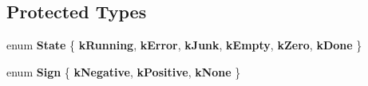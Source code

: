\subsection*{Protected Types}
\begin{DoxyCompactItemize}
\item 
\mbox{\label{classv8_1_1internal_1_1StringToIntHelper_a40ccc996ea74f912ccc03a26e29133b0}} 
enum {\bfseries State} \{ \newline
{\bfseries k\+Running}, 
{\bfseries k\+Error}, 
{\bfseries k\+Junk}, 
{\bfseries k\+Empty}, 
\newline
{\bfseries k\+Zero}, 
{\bfseries k\+Done}
 \}
\item 
\mbox{\label{classv8_1_1internal_1_1StringToIntHelper_a4c50b2079478007d54e5df830dac0fcc}} 
enum {\bfseries Sign} \{ {\bfseries k\+Negative}, 
{\bfseries k\+Positive}, 
{\bfseries k\+None}
 \}
\end{DoxyCompactItemize}
